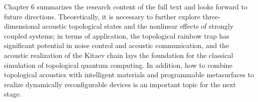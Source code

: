 \documentclass[
    type = doctor,
  ]{njuthesis}
\begin{document}
\begin{abstract*}
  Chapter 6 summarizes the research content of the full text and looks forward to future directions. Theoretically, it is necessary to further explore three-dimensional acoustic topological states and the nonlinear effects of strongly coupled systems; in terms of application, the topological rainbow trap has significant potential in noise control and acoustic communication, and the acoustic realization of the Kitaev chain lays the foundation for the classical simulation of topological quantum computing. In addition, how to combine topological acoustics with intelligent materials and programmable metasurfaces to realize dynamically reconfigurable devices is an important topic for the next stage. 
\end{abstract*}

\tableofcontents

\mainmatter












\printbibliography

\end{document}

